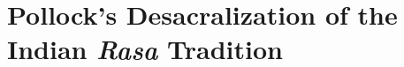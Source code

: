 \chapter[Pollock’s Desacralization of the Indian {\sl Rasa} Tradition]{Pollock’s Desacralization of the Indian \textsl{Rasa} Tradition}\label{chapter\thechapter:begin}




\label{chapter\thechapter:end}
